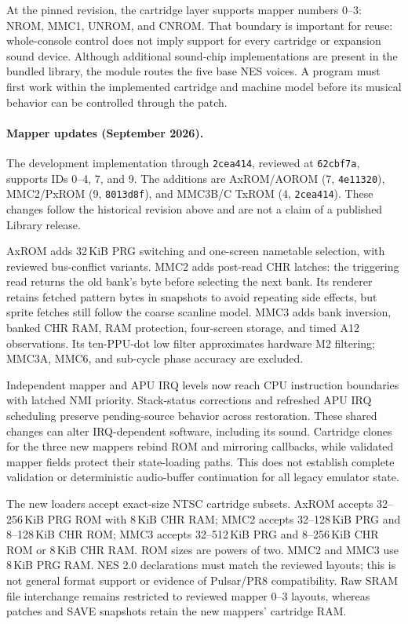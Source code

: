 \documentclass[10pt,letterpaper,twocolumn]{article}
\newcommand{\code}[1]{\texttt{#1}}
\begin{document}
At the pinned revision, the cartridge layer supports mapper numbers 0--3:
NROM, MMC1, UNROM, and CNROM.
That boundary is important for reuse: whole-console control does not imply
support for every cartridge or expansion sound device. Although additional
sound-chip implementations are present in the bundled library, the module
routes the five base NES voices. A program must first work within the
implemented cartridge and machine model before its musical behavior can be
controlled through the patch.

\paragraph{Mapper updates (September 2026).}
The development implementation through \code{2cea414}, reviewed at
\code{62cbf7a}, supports IDs 0--4, 7, and 9. The additions are
AxROM/AOROM (7, \code{4e11320}), MMC2/PxROM (9, \code{8013d8f}), and
MMC3B/C TxROM (4, \code{2cea414}). These changes follow the historical
revision above and are not a claim of a published Library release.

AxROM adds 32\,KiB PRG switching and one-screen nametable selection, with
reviewed bus-conflict variants. MMC2 adds post-read CHR latches: the triggering
read returns the old bank's byte before selecting the next bank. Its renderer
retains fetched pattern bytes in snapshots to avoid repeating side effects,
but sprite fetches still follow the coarse scanline model. MMC3 adds bank
inversion, banked CHR RAM, RAM protection, four-screen storage, and timed
A12 observations. Its ten-PPU-dot low filter approximates hardware M2
filtering; MMC3A, MMC6, and sub-cycle phase accuracy are excluded.

Independent mapper and APU IRQ levels now reach CPU instruction boundaries
with latched NMI priority. Stack-status corrections and refreshed APU IRQ
scheduling preserve pending-source behavior across restoration. These shared
changes can alter IRQ-dependent software, including its sound. Cartridge
clones for the three new mappers rebind ROM and mirroring callbacks, while
validated mapper fields protect their state-loading paths. This does not
establish complete validation or deterministic audio-buffer continuation for
all legacy emulator state.

The new loaders accept exact-size NTSC cartridge subsets. AxROM accepts
32--256\,KiB PRG ROM with 8\,KiB CHR RAM; MMC2 accepts 32--128\,KiB PRG and
8--128\,KiB CHR ROM; MMC3 accepts 32--512\,KiB PRG and 8--256\,KiB CHR ROM
or 8\,KiB CHR RAM. ROM sizes are powers of two. MMC2 and MMC3 use 8\,KiB
PRG RAM. NES 2.0 declarations must match the reviewed layouts; this is not
general format support or evidence of Pulsar/PR8 compatibility. Raw SRAM
file interchange remains restricted to reviewed mapper 0--3 layouts, whereas
patches and SAVE snapshots retain the new mappers' cartridge RAM.
\end{document}
